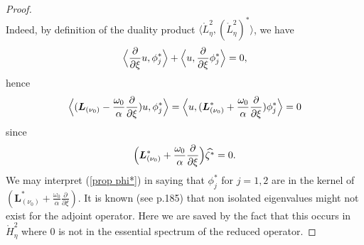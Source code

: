 \documentclass[11pt]{article}
\begin{document}
\begin{proof}
\begin{equation}
\end{equation}%
Indeed, by definition of the duality product $\langle \mathring{L}_{\eta}^{2},(%
\mathring{L}_{\eta}^{2})^{\ast }\rangle$, we have 
$$
\Bigl\langle \frac{\partial }{\partial \xi }u,\phi _{j}^{\ast }\Bigr\rangle 
+\Bigl\langle u,\frac{\partial }{\partial \xi }\phi _{j}^{\ast }\Bigr\rangle =0,
$$ 
hence
\begin{equation*}
\Bigl\langle (\boldsymbol{L}_{(\nu_0)}-\frac{\omega _{0}}{\alpha}\frac{\partial }{\partial
\xi })u,\phi _{j}^{\ast } \Bigr\rangle =
\Bigl\langle u,(\boldsymbol{L}_{(\nu_0)}^{\ast }+\frac{\omega _{0}}{\alpha }\frac{\partial }{\partial \xi })\phi _{j}^{\ast} \Bigr\rangle =0
\end{equation*}%
since%
\begin{equation*}
\Bigl( \boldsymbol{L}_{(\nu_0)}^{\ast }+\frac{\omega _{0}}{\alpha }\frac{\partial }{\partial
\xi } \Bigr)\widehat{\zeta ^{\ast }}=0.
\end{equation*}%
We may interpret (\ref{prop phi*}) in saying that $\phi _{j}^{\ast }$ for $j=1,2$
are in the kernel of $(\boldsymbol{L}_{(\nu_0)}^{\ast }+\frac{\omega _{0}}{\alpha }%
\frac{\partial }{\partial \xi })$.  It is known (see \cite%
{Kato} p.185) that non isolated eigenvalues might not exist for the adjoint
operator. Here we are saved by the fact that this occurs in $\mathring{H}%
_{\eta}^{2}$ where $0$ is not in the essential spectrum of the reduced operator.


\end{proof}
\end{document}

